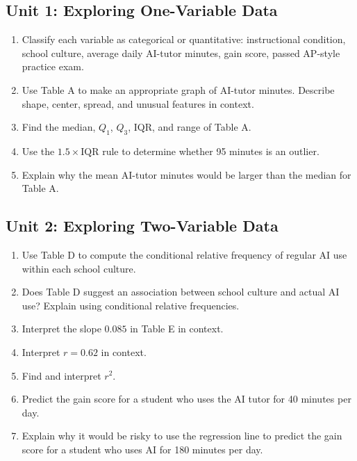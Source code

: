 \documentclass[11pt]{article}
\begin{document}
\subsection*{Unit 1: Exploring One-Variable Data}
\begin{enumerate}[leftmargin=*]
\item Classify each variable as categorical or quantitative:
instructional condition, school culture, average daily AI-tutor
minutes, gain score, passed AP-style practice exam.
\item Use Table A to make an appropriate graph of AI-tutor minutes.
Describe shape, center, spread, and unusual features in context.
\item Find the median, $Q_1$, $Q_3$, IQR, and range of Table A.
\item Use the $1.5 \times \text{IQR}$ rule to determine whether 95
minutes is an outlier.
\item Explain why the mean AI-tutor minutes would be larger than the
median for Table A.
\end{enumerate}

\subsection*{Unit 2: Exploring Two-Variable Data}
\begin{enumerate}[resume,leftmargin=*]
\item Use Table D to compute the conditional relative frequency of
regular AI use within each school culture.
\item Does Table D suggest an association between school culture and
actual AI use? Explain using conditional relative frequencies.
\item Interpret the slope $0.085$ in Table E in context.
\item Interpret $r = 0.62$ in context.
\item Find and interpret $r^2$.
\item Predict the gain score for a student who uses the AI tutor for
40 minutes per day.
\item Explain why it would be risky to use the regression line to
predict the gain score for a student who uses AI for 180 minutes
per day.
\end{enumerate}
\end{document}
